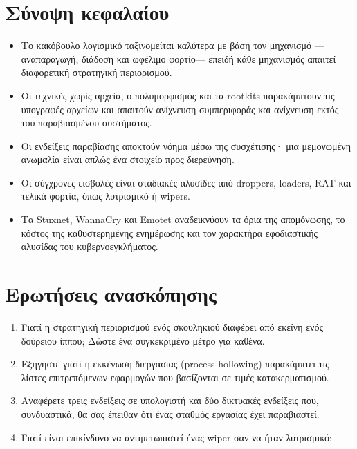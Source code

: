 \section*{Σύνοψη κεφαλαίου}
\begin{itemize}
  \item Το κακόβουλο λογισμικό ταξινομείται καλύτερα με βάση τον μηχανισμό —αναπαραγωγή, διάδοση και ωφέλιμο φορτίο— επειδή κάθε μηχανισμός απαιτεί διαφορετική στρατηγική περιορισμού.
  \item Οι τεχνικές χωρίς αρχεία, ο πολυμορφισμός και τα rootkits παρακάμπτουν τις υπογραφές αρχείων και απαιτούν ανίχνευση συμπεριφοράς και ανίχνευση εκτός του παραβιασμένου συστήματος.
  \item Οι ενδείξεις παραβίασης αποκτούν νόημα μέσω της συσχέτισης· μια μεμονωμένη ανωμαλία είναι απλώς ένα στοιχείο προς διερεύνηση.
  \item Οι σύγχρονες εισβολές είναι σταδιακές αλυσίδες από droppers, loaders, RAT και τελικά φορτία, όπως λυτρισμικό ή wipers.
  \item Τα Stuxnet, WannaCry και Emotet αναδεικνύουν τα όρια της απομόνωσης, το κόστος της καθυστερημένης ενημέρωσης και τον χαρακτήρα εφοδιαστικής αλυσίδας του κυβερνοεγκλήματος.
\end{itemize}

\section*{Ερωτήσεις ανασκόπησης}
\begin{enumerate}
  \item Γιατί η στρατηγική περιορισμού ενός σκουληκιού διαφέρει από εκείνη ενός δούρειου ίππου; Δώστε ένα συγκεκριμένο μέτρο για καθένα.
  \item Εξηγήστε γιατί η εκκένωση διεργασίας (process hollowing) παρακάμπτει τις λίστες επιτρεπόμενων εφαρμογών που βασίζονται σε τιμές κατακερματισμού.
  \item Αναφέρετε τρεις ενδείξεις σε υπολογιστή και δύο δικτυακές ενδείξεις που, συνδυαστικά, θα σας έπειθαν ότι ένας σταθμός εργασίας έχει παραβιαστεί.
  \item Γιατί είναι επικίνδυνο να αντιμετωπιστεί ένας wiper σαν να ήταν λυτρισμικό;
\end{enumerate}
